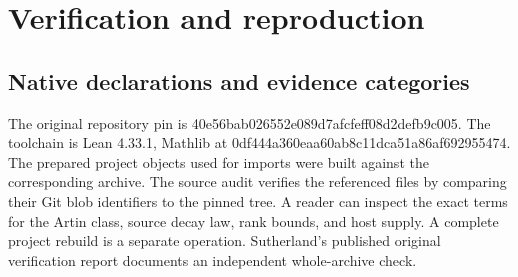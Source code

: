 \documentclass[12pt,letterpaper]{article}
\DeclareRobustCommand{\id}[1]{\mbox{\small\ttfamily #1}}
\begin{document}
\section{Verification and reproduction}
\label{sec:audit}

\subsection{Native declarations and evidence categories}

The original repository pin is \id{40e56bab026552e089d7afcfeff08d2defb9c005}. The toolchain is Lean 4.33.1, Mathlib at \id{0df444a360eaa60ab8c11dca51a86af692955474}. The prepared project objects used for imports were built against the corresponding archive. The source audit verifies the referenced files by comparing their Git blob identifiers to the pinned tree. A reader can inspect the exact terms for the Artin class, source decay law, rank bounds, and host supply. A complete project rebuild is a separate operation. Sutherland's published original verification report documents an independent whole-archive check.
\end{document}
